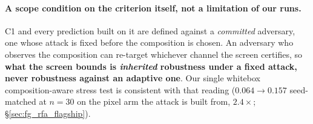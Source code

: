 \documentclass{article}
\begin{document}
\paragraph{A scope condition on the criterion itself, not a limitation of our runs.} C1 and every prediction built on it are defined against a \emph{committed} adversary, one whose attack is fixed before the composition is chosen. An adversary who observes the composition can re-target whichever channel the screen certifies, so \textbf{what the screen bounds is \emph{inherited} robustness under a fixed attack, never robustness against an adaptive one}. Our single whitebox composition-aware stress test is consistent with that reading ($0.064 \to 0.157$ seed-matched at $n{=}30$ on the pixel arm the attack is built from, $2.4\times$; §\ref{sec:fg_rfa_flagship}).
\end{document}
